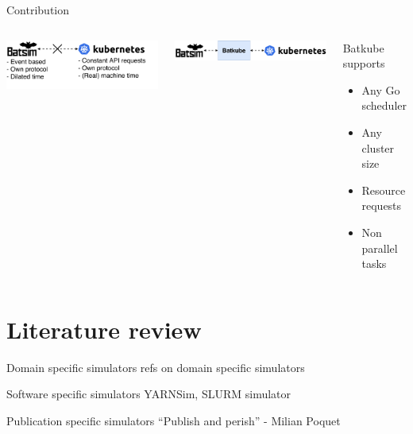 \documentclass[12pt, aspectratio=43]{beamer}
\begin{document}
\begin{frame}{Contribution}
	\begin{columns}
		\includegraphics[width=\textwidth]{../imgs/problematic.pdf}

		\vspace{1cm}

		\includegraphics[width=\textwidth]{../imgs/contribution.pdf}

		\begin{exampleblock}{Batkube supports}
			\begin{itemize}
				\item Any Go scheduler
				\item Any cluster size
				\item Resource requests
				\item Non parallel tasks
			\end{itemize}
		\end{exampleblock}
	\end{columns}
\end{frame}

\section{Literature review}
\begin{frame}{Domain specific simulators}
	refs on domain specific simulators 
\end{frame}

\begin{frame}{Software specific simulators}
	YARNSim, SLURM simulator
\end{frame}

\begin{frame}{Publication specific simulators}
	``Publish and perish'' - Milian Poquet
\end{frame}
\end{document}
